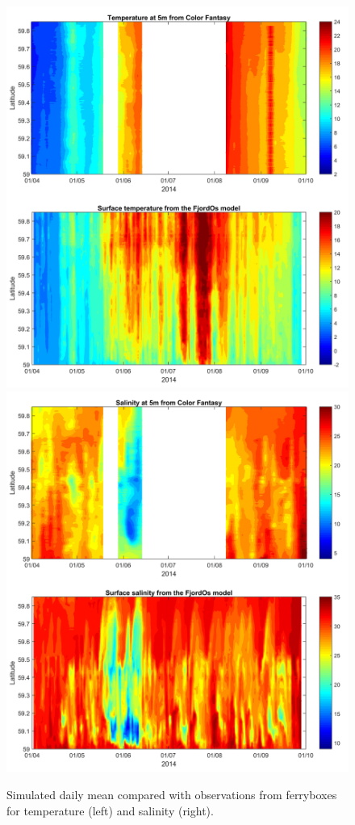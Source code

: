 \documentclass[12pt,a4paper,english]{article}
\begin{document}
\begin{figure}[ht]
\centerline{
\includegraphics*[trim=1cm 0cm 1cm 0cm,clip=true,width=.5\textwidth]{Figurer/FjordOs_vs_Ferrybox_TEMP}
\includegraphics*[trim=1cm 0cm 1cm 0cm,clip=true,width=.5\textwidth]{Figurer/FjordOs_vs_Ferrybox_SALT}}
\caption{\small
Simulated daily mean compared with observations from ferryboxes for temperature (left) and salinity (right).}
\label{fig:Ferrybox_temp_salt}
\end{figure}

\clearpage 

%

\end{document}
